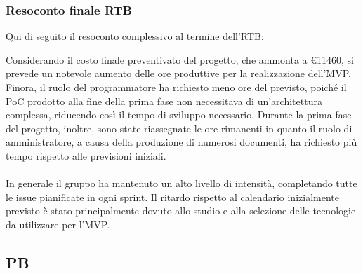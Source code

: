 \subsubsection{Resoconto finale RTB}
Qui di seguito il resoconto complessivo al termine dell'RTB:



Considerando il costo finale preventivato del progetto, che ammonta a \euro{11460}, si prevede un notevole aumento delle ore produttive per la realizzazione dell'MVP.\\
Finora, il ruolo del programmatore ha richiesto meno ore del previsto, poiché il PoC prodotto alla fine della prima fase non necessitava di un'architettura complessa, riducendo così il tempo di sviluppo necessario. 
Durante la prima fase del progetto, inoltre, sono state riassegnate le ore rimanenti in quanto il ruolo di amministratore, a causa della produzione di numerosi documenti, ha richiesto più tempo rispetto alle previsioni iniziali.\\\\
In generale il gruppo ha mantenuto un alto livello di intensità, completando tutte le issue pianificate in ogni sprint. 
Il ritardo rispetto al calendario inizialmente previsto è stato principalmente dovuto allo studio e alla selezione delle tecnologie da utilizzare per l'MVP.

\pagebreak

\subsection{PB}


